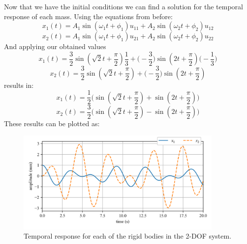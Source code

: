 \documentclass[12pt,letter]{article}
\begin{document}
\begin{example}
	Now that we have the initial conditions we can find a solution for the temporal response of each mass. Using the equations from before:
	\begin{equation}
		x_1(t) = A_1 \sin (\omega_1 t + \phi_1 )u_{11} + A_2 \sin (\omega_2 t + \phi_2 )u_{12}
	\end{equation}
	\begin{equation}
		x_2(t) = A_1 \sin (\omega_1 t + \phi_1 )u_{21} + A_2 \sin (\omega_2 t + \phi_2 )u_{22}
	\end{equation}
	And applying our obtained values
	\begin{equation}
		x_1(t) = \frac{3}{2} \sin (\sqrt{2} t + \frac{\pi}{2} )\frac{1}{3} + \bigg(-\frac{3}{2}\bigg) \sin (2 t + \frac{\pi}{2} ) \bigg(-\frac{1}{3}\bigg)
	\end{equation}
	\begin{equation}
		x_2(t) = \frac{3}{2} \sin (\sqrt{2} t + \frac{\pi}{2} ) + \bigg(-\frac{3}{2}\bigg) \sin (2 t + \frac{\pi}{2} )
	\end{equation}
	results in:
	\begin{equation}
		x_1(t) = \frac{1}{2} \bigg(  \sin (\sqrt{2} t + \frac{\pi}{2} ) + \sin (2 t + \frac{\pi}{2} ) \bigg)
	\end{equation}
	\begin{equation}
		x_2(t) = \frac{3}{2}  \bigg( \sin (\sqrt{2} t + \frac{\pi}{2} ) -\sin (2 t + \frac{\pi}{2} ) \bigg)
	\end{equation}
	These results can be plotted as:
	\begin{figure}[H]
		\centering
		\includegraphics[width=0.9\textwidth]{../figures/2-DOF_response.png}
		\caption{Temporal response for each of the rigid bodies in the 2-DOF system.}
	\end{figure}
	\end{example}
	
	
	
	
	
\end{document}

